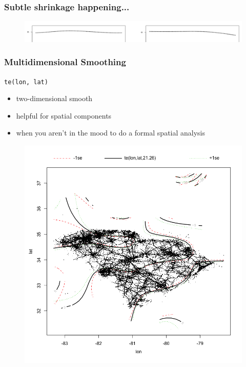 \documentclass{beamer}
\begin{document}
\begin{frame}
\frametitle{Subtle shrinkage happening...}

\begin{figure}
\includegraphics[scale=.28]{figures/zoomIn}
\end{figure}

\end{frame}



\begin{frame}
\frametitle{Multidimensional Smoothing}

\begin{multicols}{2}
\texttt{te(lon, lat)}

\begin{itemize}
\item two-dimensional smooth
\item helpful for spatial components
\item when you aren't in the mood to do a formal spatial analysis
\end{itemize}

\columnbreak

\begin{figure}
\includegraphics[scale=0.2]{figures/spatialSmooth}
\end{figure}

\end{multicols}
\end{frame}
\end{document}
